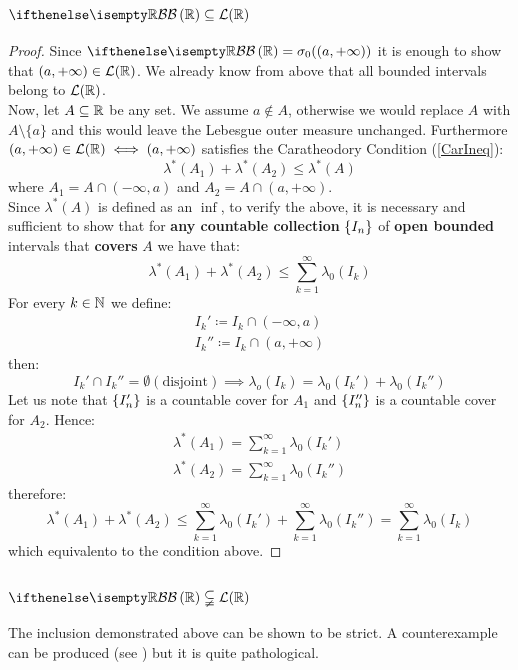 \subsection{\texorpdfstring{$\B[\R] \subseteq \Leb(\R)$}{B(R) is included in L(R)}}
\begin{proof}
    Since $\B[\R]=\sigma_0((a,+\infty))$ it is enough to show that $(a,+\infty)\in\mathcal{L}(\mathbb{R})$. We already know from above that all bounded intervals belong to $\mathcal{L}(\mathbb{R})$. \\
    Now, let $A\subseteq\mathbb{R}$ be any set. We assume $a\notin A$, otherwise we would replace $A$ with $A\setminus\{a\}$ and this would leave the Lebesgue outer measure unchanged. Furthermore $(a,+\infty)\in\mathcal{L}(\mathbb{R}) \iff (a,+\infty)$ satisfies the Caratheodory Condition (\ref{CarIneq}):
    \[
        \lambda^*(A_1)+\lambda^*(A_2)\leq\lambda^*(A) \label{a}
    \]
    where $A_1 = A\cap (-\infty,a)$ and $A_2 = A \cap (a,+\infty)$.\\
    Since $\lambda^*(A)$ is defined as an $\inf$, to verify the above, it is necessary and sufficient to show that for \textbf{any countable collection} $\{ I_n \}$ of \textbf{open bounded} intervals that \textbf{covers} $A$ we have that:
    \[
        \lambda^*(A_1)+\lambda^*(A_2)\leq \sum_{k=1}^{\infty} \lambda_0(I_k)
    \]
    For every $k\in\mathbb{N}$ we define:
    \begin{align*}
        I_k' \coloneqq I_k \cap (-\infty, a) \\
        I_k'' \coloneqq I_k \cap (a,+\infty)
    \end{align*}
    then:
    \[
        I_k' \cap I_k'' = \emptyset (\text{disjoint}) \implies \lambda_o(I_k) = \lambda_0(I_k') + \lambda_0 (I_k'')
    \]
    Let us note that $\{ I'_n \}$ is a countable cover for $A_1$ and $\{ I''_n \}$ is a countable cover for $A_2$.
    Hence:
    \begin{align*}
        \lambda^*(A_1)=\sum_{k=1}^{\infty} \lambda_0(I_k') \\
        \lambda^*(A_2)=\sum_{k=1}^{\infty} \lambda_0(I_k'')
    \end{align*}
    therefore:
    \[
        \lambda^*(A_1)+\lambda^*(A_2)\leq \sum_{k=1}^{\infty} \lambda_0(I_k') + \sum_{k=1}^{\infty} \lambda_0(I_k'') = \sum_{k=1}^{\infty} \lambda_0(I_k)
    \]
    which equivalento to the condition above.
\end{proof}

\subsection{\texorpdfstring{$\B[\R] \subsetneqq \Leb(\R)$}{B(R) is strictly included in L(R)}}
The inclusion demonstrated above can be shown to be strict. A counterexample can be produced (see \href{https://math.stackexchange.com/questions/141017/lebesgue-measurable-set-that-is-not-a-borel-measurable-set}{\color{blue}{here}}) but it is quite pathological.

